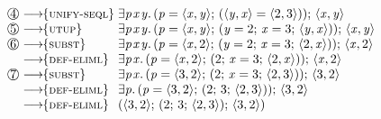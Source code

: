 \documentclass[acmsmall,review,dvipsnames]{acmart}
\newcommand{\Varid}[1]{\mathit{#1}}
\newcommand{\rulename}[1]{\textsc{\small #1}}
\newcommand{\movesto}{\longrightarrow}
\newcommand{\movestoC}[1]{\movesto\!\!\{#1\}}
\newcommand{\movestoR}[1]{\movestoC{\rulename{#1}}}
\begin{document}
\begin{figure}
\begin{scriptsize}
$$\begin{array}{@{}l@{\;}l@{\;}l@{}}
\circlednum{4} & \movestoR{unify-seql}     & \ensuremath{\exists\Varid{p}\hspace{0.3mm}\Varid{x}\hspace{0.3mm}\Varid{y}.\,(\Varid{p}\mathrel{=}\langle{}\Varid{x},\Varid{y}\rangle;\,(\langle{}\Varid{y},\Varid{x}\rangle\mathrel{=}\langle{}\mathrm{2},\mathrm{3}\rangle));\,\langle{}\Varid{x},\Varid{y}\rangle} \\
\circlednum{5} & \movestoR{utup}           & \ensuremath{\exists\Varid{p}\hspace{0.3mm}\Varid{x}\hspace{0.3mm}\Varid{y}.\,(\Varid{p}\mathrel{=}\langle{}\Varid{x},\Varid{y}\rangle;\,(\Varid{y}\mathrel{=}\mathrm{2};\,\Varid{x}\mathrel{=}\mathrm{3};\,\langle{}\Varid{y},\Varid{x}\rangle));\,\langle{}\Varid{x},\Varid{y}\rangle} \\
\circlednum{6} & \movestoR{subst}          & \ensuremath{\exists\Varid{p}\hspace{0.3mm}\Varid{x}\hspace{0.3mm}\Varid{y}.\,(\Varid{p}\mathrel{=}\langle{}\Varid{x},\mathrm{2}\rangle;\,(\Varid{y}\mathrel{=}\mathrm{2};\,\Varid{x}\mathrel{=}\mathrm{3};\,\langle{}\mathrm{2},\Varid{x}\rangle));\,\langle{}\Varid{x},\mathrm{2}\rangle} \\
               & \movestoR{def-eliml}      & \ensuremath{\exists\Varid{p}\hspace{0.3mm}\Varid{x}.\,(\Varid{p}\mathrel{=}\langle{}\Varid{x},\mathrm{2}\rangle;\,(\mathrm{2};\,\Varid{x}\mathrel{=}\mathrm{3};\,\langle{}\mathrm{2},\Varid{x}\rangle));\,\langle{}\Varid{x},\mathrm{2}\rangle} \\
\circlednum{7} & \movestoR{subst}          & \ensuremath{\exists\Varid{p}\hspace{0.3mm}\Varid{x}.\,(\Varid{p}\mathrel{=}\langle{}\mathrm{3},\mathrm{2}\rangle;\,(\mathrm{2};\,\Varid{x}\mathrel{=}\mathrm{3};\,\langle{}\mathrm{2},\mathrm{3}\rangle));\,\langle{}\mathrm{3},\mathrm{2}\rangle} \\
               & \movestoR{def-eliml}      & \ensuremath{\exists\Varid{p}.\,(\Varid{p}\mathrel{=}\langle{}\mathrm{3},\mathrm{2}\rangle;\,(\mathrm{2};\,\mathrm{3};\,\langle{}\mathrm{2},\mathrm{3}\rangle));\,\langle{}\mathrm{3},\mathrm{2}\rangle} \\
               & \movestoR{def-eliml}      & \ensuremath{(\langle{}\mathrm{3},\mathrm{2}\rangle;\,(\mathrm{2};\,\mathrm{3};\,\langle{}\mathrm{2},\mathrm{3}\rangle);\,\langle{}\mathrm{3},\mathrm{2}\rangle)} \\

\end{array}$$
\end{scriptsize}
\end{figure}
\end{document}
